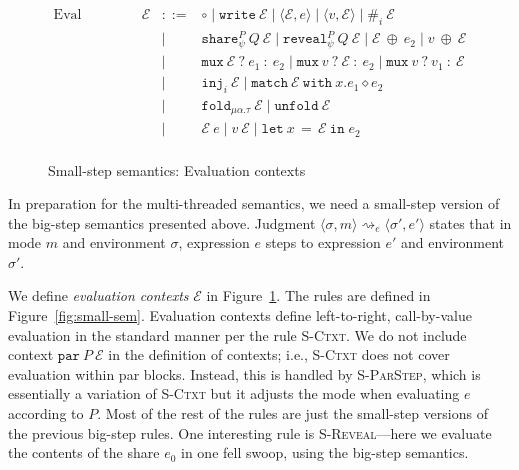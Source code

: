\documentclass[10pt]{article}
\newcommand{\rulelab}[1]{{\small \textsc{#1}}}
\newcommand{\kw}[1]{\ensuremath{\mathtt{#1}}}
\newcommand{\trec}[2]{\ensuremath{\mu {#1}.{#2}}}
\newcommand{\ebinop}[2]{\ensuremath{{#1}~\oplus~{#2}}}
\newcommand{\elet}[3]{\ensuremath{\kw{let}~#1\, =\, #2~\kw{in}\;{#3}}}
\newcommand{\epar}[2]{\ensuremath{\kw{par}~{#1}~{#2}}}
\newcommand{\ereveal}[4]{\ensuremath{\kw{reveal}^{#1}_{#4}~{#2}~{#3}}}
\newcommand{\econd}[3]{\ensuremath{\kw{match}~{#1}~\kw{with}~x.{#2} \diamond {#3}}}
\newcommand{\emux}[3]{\ensuremath{\kw{mux}~{#1}~\kw{?}~{#2}~\kw{:}~{#3}}}
\newcommand{\eshare}[4]{\ensuremath{\kw{share}^{#2}_{#1}~{#3}~{#4}}}
\newcommand{\einj}[2]{\ensuremath{\kw{inj}_{#1}~{#2}}}
\newcommand{\ewrite}[1]{\ensuremath{\kw{write}~{#1}}}
\newcommand{\epair}[2]{\ensuremath{\langle {#1}, {#2} \rangle}}
\newcommand{\eproj}[2]{\ensuremath{\kw{\#}}_{#1}~{#2}}
\newcommand{\eapp}[2]{\ensuremath{{#1}~{#2}}}
\newcommand{\efold}[2]{\ensuremath{\kw{fold}_{#1}~{#2}}}
\newcommand{\eunfold}[1]{\ensuremath{\kw{unfold}~{#1}}}
\newcommand{\seval}[5]{\ensuremath{\config{#1}{#3} \rightsquigarrow_{#2} \config{#4}{#5}}}
\newcommand{\env}{\ensuremath{\sigma}}
\newcommand{\config}[2]{\ensuremath{\langle{#1},{#2}\rangle}}
\newcommand{\ctxt}{\ensuremath{\mathcal{E}}}
\newcommand{\hole}{\ensuremath{\circ}}
\begin{document}
\begin{figure}
  \[\begin{array}{rlcl}
      \text{Eval Context} & \ctxt & ::= & \hole \mid \ewrite{\ctxt} \mid
                                          \epair{\ctxt}{e} \mid
                             \epair{v}{\ctxt} \mid \eproj{i}{\ctxt}  \\
               && \mid & \eshare{\psi}{P}{Q}{\ctxt} \mid
                             \ereveal{P}{Q}{\ctxt}{\psi} \mid \ebinop{\ctxt}{e_2} \mid \ebinop{v}{\ctxt}   \\
               && \mid & \emux{\ctxt}{e_1}{e_2}
                         \mid \emux{v}{\ctxt}{e_2} \mid \emux{v}{v_1}{\ctxt}    \\
               && \mid & \einj{i}{\ctxt} \mid \econd{\ctxt}{e_1}{e_2}   \\
               && \mid & \efold{\trec{\alpha}{\tau}}{\ctxt} \mid \eunfold{\ctxt}  \\
                          && \mid & \eapp{\ctxt}{e} \mid
                         \eapp{v}{\ctxt} \mid \elet{x}{\ctxt}{e_2} \\
    \end{array}
  \]
  \caption{Small-step semantics: Evaluation contexts}
  \label{fig:ctxts}
\end{figure}

In preparation for the multi-threaded semantics, we need a small-step
version of the big-step semantics presented above. Judgment
$\seval{\env}{e}{m}{\env'}{e'}$ states that in mode $m$ and
environment $\env$, expression $e$ steps to expression $e'$ and
environment $\env'$.

We define \emph{evaluation contexts} $\ctxt$ in
Figure~\ref{fig:ctxts}. The rules are defined in
Figure~\ref{fig:small-sem}. Evaluation contexts define left-to-right,
call-by-value evaluation in the standard manner per the rule
\rulelab{S-Ctxt}. We do not include context $\epar{P}{\ctxt}$ in the
definition of contexts; i.e., \rulelab{S-Ctxt} does not cover
evaluation within par blocks. Instead, this is handled by
\rulelab{S-ParStep}, which is essentially a variation of
\rulelab{S-Ctxt} but it adjusts the mode when evaluating $e$ according
to $P$. Most of the rest of the rules are just the small-step versions
of the previous big-step rules. One interesting rule is
\rulelab{S-Reveal}---here we evaluate the contents of the share $e_0$
in one fell swoop, using the big-step semantics.
\end{document}
